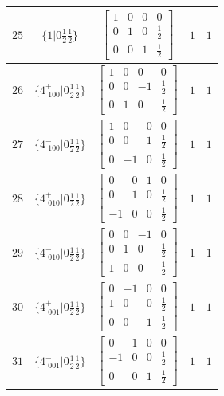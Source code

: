 \documentclass[fleqn,8pt]{jsarticle}
\begin{document}
\begin{longtable}{ccccc}
$ 25 $ & $ \{1|0 \frac{1}{2} \frac{1}{2}\} $ & $ \begin{bmatrix} 1 & 0 & 0 & 0 \\ 0 & 1 & 0 & \frac{1}{2} \\ 0 & 0 & 1 & \frac{1}{2} \end{bmatrix} $ & $ 1 $ & $ 1 $ \\ \hline
$ 26 $ & $ \{4^{+}_{\,\,100}|0 \frac{1}{2} \frac{1}{2}\} $ & $ \begin{bmatrix} 1 & 0 & 0 & 0 \\ 0 & 0 & -1 & \frac{1}{2} \\ 0 & 1 & 0 & \frac{1}{2} \end{bmatrix} $ & $ 1 $ & $ 1 $ \\ \hline
$ 27 $ & $ \{4^{-}_{\,\,100}|0 \frac{1}{2} \frac{1}{2}\} $ & $ \begin{bmatrix} 1 & 0 & 0 & 0 \\ 0 & 0 & 1 & \frac{1}{2} \\ 0 & -1 & 0 & \frac{1}{2} \end{bmatrix} $ & $ 1 $ & $ 1 $ \\ \hline
$ 28 $ & $ \{4^{+}_{\,\,010}|0 \frac{1}{2} \frac{1}{2}\} $ & $ \begin{bmatrix} 0 & 0 & 1 & 0 \\ 0 & 1 & 0 & \frac{1}{2} \\ -1 & 0 & 0 & \frac{1}{2} \end{bmatrix} $ & $ 1 $ & $ 1 $ \\ \hline
$ 29 $ & $ \{4^{-}_{\,\,010}|0 \frac{1}{2} \frac{1}{2}\} $ & $ \begin{bmatrix} 0 & 0 & -1 & 0 \\ 0 & 1 & 0 & \frac{1}{2} \\ 1 & 0 & 0 & \frac{1}{2} \end{bmatrix} $ & $ 1 $ & $ 1 $ \\ \hline
$ 30 $ & $ \{4^{+}_{\,\,001}|0 \frac{1}{2} \frac{1}{2}\} $ & $ \begin{bmatrix} 0 & -1 & 0 & 0 \\ 1 & 0 & 0 & \frac{1}{2} \\ 0 & 0 & 1 & \frac{1}{2} \end{bmatrix} $ & $ 1 $ & $ 1 $ \\ \hline
$ 31 $ & $ \{4^{-}_{\,\,001}|0 \frac{1}{2} \frac{1}{2}\} $ & $ \begin{bmatrix} 0 & 1 & 0 & 0 \\ -1 & 0 & 0 & \frac{1}{2} \\ 0 & 0 & 1 & \frac{1}{2} \end{bmatrix} $ & $ 1 $ & $ 1 $ \\ \hline

\end{longtable}
\end{document}
